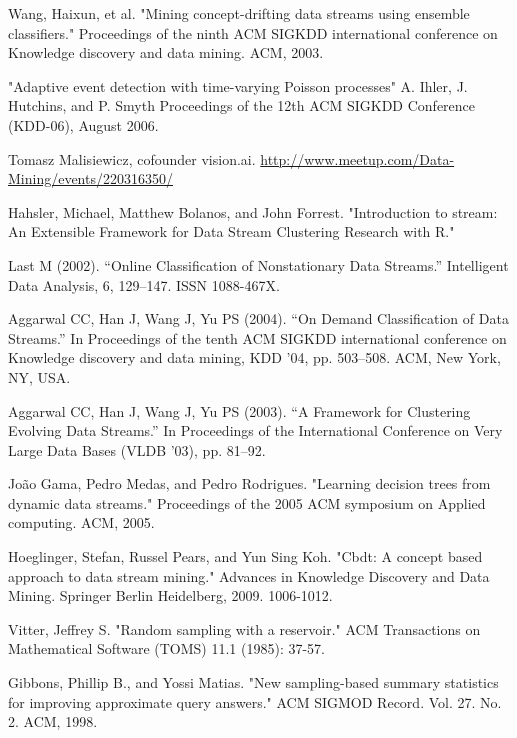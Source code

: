 \documentclass[conference]{IEEEtran}
\begin{document}
\begin{thebibliography}{9}
			Wang, Haixun, et al. "Mining concept-drifting data streams using ensemble classifiers." Proceedings of the ninth ACM SIGKDD international conference on Knowledge discovery and data mining. ACM, 2003.
			
			"Adaptive event detection with time-varying Poisson processes"
			A. Ihler, J. Hutchins, and P. Smyth
			Proceedings of the 12th ACM SIGKDD Conference (KDD-06), August 2006.
			
			Tomasz Malisiewicz, cofounder vision.ai. \url{http://www.meetup.com/Data-Mining/events/220316350/}
			
			Hahsler, Michael, Matthew Bolanos, and John Forrest. "Introduction to stream: An Extensible Framework for Data Stream Clustering Research with R."
			
			Last M (2002). “Online Classification of Nonstationary Data Streams.” Intelligent Data
			Analysis, 6, 129–147. ISSN 1088-467X.
			
			Aggarwal CC, Han J, Wang J, Yu PS (2004). “On Demand Classification of Data Streams.” In
			Proceedings of the tenth ACM SIGKDD international conference on Knowledge discovery
			and data mining, KDD ’04, pp. 503–508. ACM, New York, NY, USA.
			
			Aggarwal CC, Han J, Wang J, Yu PS (2003). “A Framework for Clustering Evolving Data
			Streams.” In Proceedings of the International Conference on Very Large Data Bases (VLDB
			’03), pp. 81–92.
			
			João Gama, Pedro Medas, and Pedro Rodrigues. "Learning decision trees from dynamic data streams." Proceedings of the 2005 ACM symposium on Applied computing. ACM, 2005.
			
			Hoeglinger, Stefan, Russel Pears, and Yun Sing Koh. "Cbdt: A concept based approach to data stream mining." Advances in Knowledge Discovery and Data Mining. Springer Berlin Heidelberg, 2009. 1006-1012.
			
			Vitter, Jeffrey S. "Random sampling with a reservoir." ACM Transactions on Mathematical Software (TOMS) 11.1 (1985): 37-57.
			
			Gibbons, Phillip B., and Yossi Matias. "New sampling-based summary statistics for improving approximate query answers." ACM SIGMOD Record. Vol. 27. No. 2. ACM, 1998.
			

\end{thebibliography}
\end{document}
